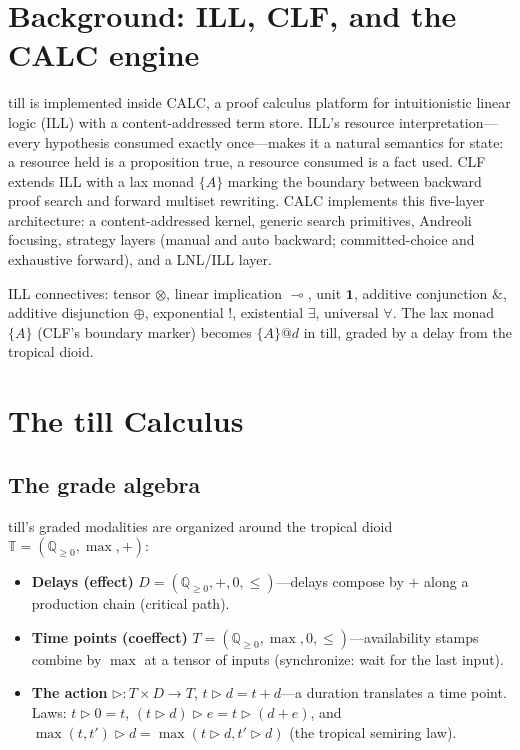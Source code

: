 \documentclass[11pt]{article}
\makeatletter
\newcommand{\loli}{\multimap}                   %
\newcommand{\tensor}{\otimes}                   %
\newcommand{\with}{\mathbin{\&}}                %
\newcommand{\adddisj}{\oplus}                   %
\newcommand{\action}{\triangleright}            %
\newcommand{\laxm}[2]{\{#1\}@{#2}}
\newcommand{\laxb}[1]{\{#1\}}
\newcommand{\Qnn}{\mathbb{Q}_{\geq 0}}
\newcommand{\Ttrop}{\mathbb{T}}
\theoremstyle{remark}
\makeatother
\begin{document}
\section{Background: ILL, CLF, and the CALC engine}
\label{sec:background}

till is implemented inside CALC, a proof calculus platform for intuitionistic
linear logic (ILL) with a content-addressed term store.  ILL's resource
interpretation---every hypothesis consumed exactly once---makes it a natural
semantics for state: a resource held is a proposition true, a resource consumed
is a fact used.  CLF~\cite{WatkinsCervesatoPfenningWalker02} extends ILL with a
lax monad $\laxb{A}$ marking the boundary between backward proof search and
forward multiset rewriting.  CALC implements this five-layer architecture: a
content-addressed kernel, generic search primitives, Andreoli focusing, strategy
layers (manual and auto backward; committed-choice and exhaustive forward), and a
LNL/ILL layer.

ILL connectives: tensor $\tensor$, linear implication $\loli$, unit $\mathbf{1}$,
additive conjunction $\with$, additive disjunction $\adddisj$, exponential $!$,
existential $\exists$, universal $\forall$.  The lax monad $\laxb{A}$ (CLF's
boundary marker) becomes $\laxm{A}{d}$ in till, graded by a delay from the
tropical dioid.

\section{The till Calculus}
\label{sec:calculus}

\subsection{The grade algebra}
\label{sec:grade-algebra}

till's graded modalities are organized around the tropical dioid
$\Ttrop = (\Qnn, \max, +)$:

\begin{itemize}
\item \textbf{Delays (effect)} $D = (\Qnn, +, 0, \leq)$---delays compose by $+$
  along a production chain (critical path).
\item \textbf{Time points (coeffect)} $T = (\Qnn, \max, 0, \leq)$---availability
  stamps combine by $\max$ at a tensor of inputs (synchronize: wait for the last
  input).
\item \textbf{The action} $\action : T \times D \to T$, $t \action d = t + d$---a
  duration translates a time point.  Laws: $t \action 0 = t$,
  $(t \action d) \action e = t \action (d + e)$, and
  $\max(t,t') \action d = \max(t \action d, t' \action d)$ (the tropical semiring
  law).
\end{itemize}
\end{document}
